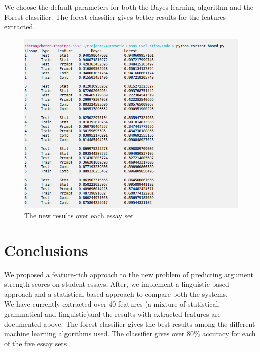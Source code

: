 \documentclass[BTech]{nitkdiss}
\begin{document}
We choose the default parameters for both the Bayes learning algorithm and the Forest classifier. The forest classifier gives better results for the features extracted. 

\begin{figure}[h!]
\centering
\includegraphics[scale=0.90]{output.png}
\caption{The new results over each essay set}
\label{fig:results}
\end{figure}

\chapter{Conclusions}
We proposed a feature-rich approach to the new problem of predicting argument strength scores on student essays. After, we implement a linguistic based approach and a statistical based approach to compare both the systems.\\

We have currently extracted over 40 features (a mixture of statistical, grammatical and linguistic)and the results with extracted features are documented above. The forest classifier gives the best results among the different machine learning algorithms used. The classifier gives over 80\% accuracy for each of the five essay sets. \\
\end{document}
